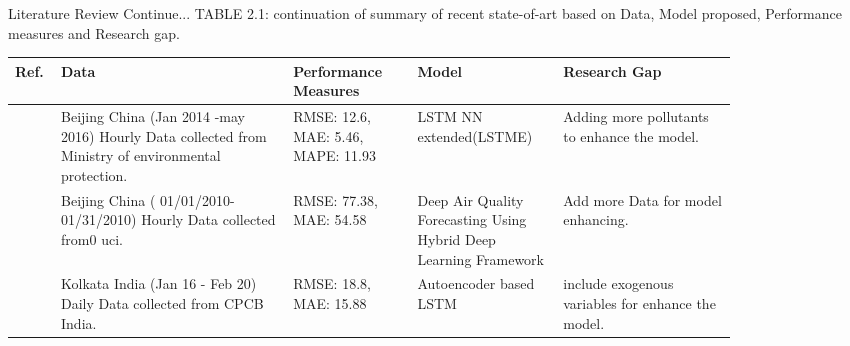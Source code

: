 \documentclass[12pt, aspectratio=169]{beamer}
\begin{document}
\begin{frame}{Literature Review  \tiny{Continue...}}
	\centering
	\scriptsize {TABLE 2.1: continuation of summary of recent state-of-art based on Data,  Model proposed,  Performance measures and Research gap.}\\
	\begin{table}
		\centering
		\begin{tabular}{|p{0.03\linewidth}|p{0.29\linewidth}|p{0.15\linewidth}|p{0.16\linewidth}|p{0.21\linewidth}|}
			\hline
			\footnotesize \textbf {Ref.} & \footnotesize \textbf { Data} & \footnotesize \textbf {Performance Measures } & \footnotesize \textbf {Model} & \footnotesize \textbf {Research Gap }  \\ \hline
			\scriptsize  \cite{li2017long}          \scriptsize & Beijing China (Jan 2014 -may   2016) Hourly Data collected from Ministry of environmental protection.    \scriptsize & RMSE: 12.6,  MAE: 5.46,  MAPE:  11.93                                                                        \scriptsize & LSTM NN extended(LSTME)                                             \scriptsize & Adding more pollutants to enhance the model.                                           \\\hline
			\scriptsize \cite{du2019deep}         \scriptsize & Beijing China (   01/01/2010-01/31/2010) Hourly Data collected from0 uci.                                 \scriptsize & RMSE: 77.38,  MAE: 54.58                                                                                   \scriptsize & Deep Air Quality Forecasting   Using Hybrid Deep Learning Framework \scriptsize & Add more Data for model enhancing.\\\hline
			\scriptsize \cite{nath2021long}       \scriptsize & Kolkata India (Jan 16 - Feb 20)  Daily Data collected from CPCB   India.                               \scriptsize & RMSE: 18.8,  MAE: 15.88                                                                                    \scriptsize & Autoencoder based LSTM                                             \scriptsize &  include exogenous variables for enhance the model. \\ \hline
		   \end{tabular}
	\end{table}
\end{frame}





\end{document}
